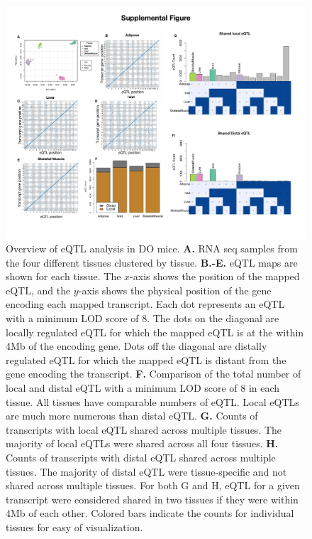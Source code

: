 \documentclass[
]{article}
\begin{document}
\begin{figure}[ht!]
\includegraphics[width=\textwidth]{Figures/Supp_Fig_eQTL.pdf} 
\caption{Overview of eQTL analysis in DO mice. \textbf{A.} RNA seq 
samples from the four different tissues clustered by tissue. 
\textbf{B.-E.} eQTL maps are shown for each tissue. The $x$-axis 
shows the position of the mapped eQTL, and the $y$-axis shows the 
physical position of the gene encoding each mapped transcript. 
Each dot represents an eQTL with a minimum LOD score of 8. The dots 
on the diagonal are locally regulated eQTL for which the mapped eQTL 
is at the within 4Mb of the encoding gene. Dots off the diagonal are 
distally regulated eQTL for which the mapped eQTL is distant from the 
gene encoding the transcript. \textbf{F.} Comparison of the total number 
of local and distal eQTL with a minimum LOD score of 8 in each tissue. 
All tissues have comparable numbers of eQTL. Local eQTLs are much more 
numerous than distal eQTL. \textbf{G.} Counts of transcripts with local 
eQTL shared across multiple tissues. The majority of local eQTLs were 
shared across all four tissues. \textbf{H.} Counts of transcripts with 
distal eQTL shared across multiple tissues. The majority of distal eQTL 
were tissue-specific and not shared across multiple tissues. For both G 
and H, eQTL for a given transcript were considered shared in two tissues 
if they were within 4Mb of each other. Colored bars indicate the counts 
for individual tissues for easy of visualization.
}
\label{fig:eQTL}
\end{figure}
\end{document}
